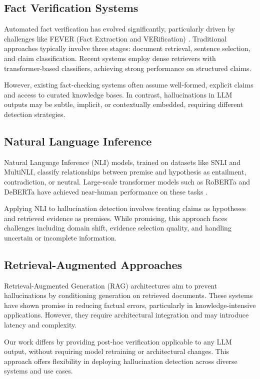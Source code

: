 \documentclass[conference]{IEEEtran}
\begin{document}
\subsection{Fact Verification Systems}

Automated fact verification has evolved significantly, particularly driven by challenges like FEVER (Fact Extraction and VERification) \cite{fever_dataset}. Traditional approaches typically involve three stages: document retrieval, sentence selection, and claim classification. Recent systems employ dense retrievers with transformer-based classifiers, achieving strong performance on structured claims.

However, existing fact-checking systems often assume well-formed, explicit claims and access to curated knowledge bases. In contrast, hallucinations in LLM outputs may be subtle, implicit, or contextually embedded, requiring different detection strategies.

\subsection{Natural Language Inference}

Natural Language Inference (NLI) models, trained on datasets like SNLI and MultiNLI, classify relationships between premise and hypothesis as entailment, contradiction, or neutral. Large-scale transformer models such as RoBERTa and DeBERTa have achieved near-human performance on these tasks \cite{roberta_nli}.

Applying NLI to hallucination detection involves treating claims as hypotheses and retrieved evidence as premises. While promising, this approach faces challenges including domain shift, evidence selection quality, and handling uncertain or incomplete information.

\subsection{Retrieval-Augmented Approaches}

Retrieval-Augmented Generation (RAG) architectures aim to prevent hallucinations by conditioning generation on retrieved documents. These systems have shown promise in reducing factual errors, particularly in knowledge-intensive applications. However, they require architectural integration and may introduce latency and complexity.

Our work differs by providing post-hoc verification applicable to any LLM output, without requiring model retraining or architectural changes. This approach offers flexibility in deploying hallucination detection across diverse systems and use cases.
\end{document}
